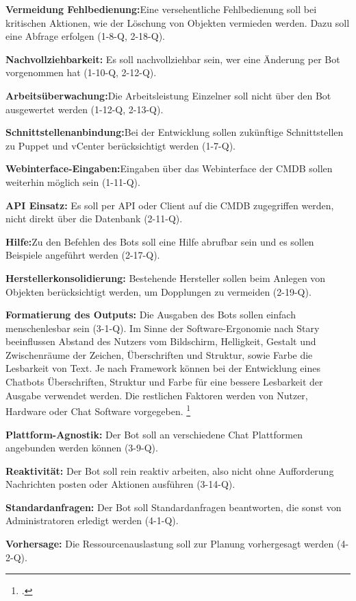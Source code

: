 \textbf{Vermeidung Fehlbedienung:}Eine versehentliche Fehlbedienung soll bei kritischen Aktionen, wie der Löschung von Objekten vermieden werden. Dazu soll eine Abfrage erfolgen (1-8-Q, 2-18-Q).

\textbf{Nachvollziehbarkeit: }Es soll nachvollziehbar sein, wer eine Änderung per Bot vorgenommen hat (1-10-Q, 2-12-Q).

\textbf{Arbeitsüberwachung:}Die Arbeitsleistung Einzelner soll nicht über den Bot ausgewertet werden (1-12-Q, 2-13-Q).

\textbf{Schnittstellenanbindung:}Bei der Entwicklung sollen zukünftige Schnittstellen zu Puppet und vCenter berücksichtigt werden (1-7-Q).

\textbf{Webinterface-Eingaben:}Eingaben über das Webinterface der \acs{CMDB} sollen weiterhin möglich sein (1-11-Q).

\textbf{API Einsatz:} Es soll per API oder Client auf die \acs{CMDB} zugegriffen werden, nicht direkt über die Datenbank (2-11-Q).

\textbf{Hilfe:}Zu den Befehlen des Bots soll eine Hilfe abrufbar sein und es sollen Beispiele angeführt werden (2-17-Q).

\textbf{Herstellerkonsolidierung:} Bestehende Hersteller sollen beim Anlegen von Objekten berücksichtigt werden, um Dopplungen zu vermeiden (2-19-Q).

\textbf{Formatierung des Outputs:} Die Ausgaben des Bots sollen einfach menschenlesbar sein (3-1-Q). Im Sinne der Software-Ergonomie nach Stary beeinflussen Abstand des Nutzers vom Bildschirm, Helligkeit, Gestalt und Zwischenräume der Zeichen, Überschriften und Struktur, sowie Farbe die Lesbarkeit von Text. Je nach Framework können bei der Entwicklung eines Chatbots Überschriften, Struktur und Farbe für eine bessere Lesbarkeit der Ausgabe verwendet werden. Die restlichen Faktoren werden von Nutzer, Hardware oder Chat Software vorgegeben.
\footcite[Vgl.][66\psq]{Stary_1996_Ergonomie}

\textbf{Plattform-Agnostik:} Der Bot soll an verschiedene Chat Plattformen angebunden werden können (3-9-Q).

\textbf{Reaktivität:} Der Bot soll rein reaktiv arbeiten, also nicht ohne Aufforderung Nachrichten posten oder Aktionen ausführen (3-14-Q).

\textbf{Standardanfragen:} Der Bot soll Standardanfragen beantworten, die sonst von Administratoren erledigt werden (4-1-Q).

\textbf{Vorhersage:} Die Ressourcenauslastung soll zur Planung vorhergesagt werden (4-2-Q).

